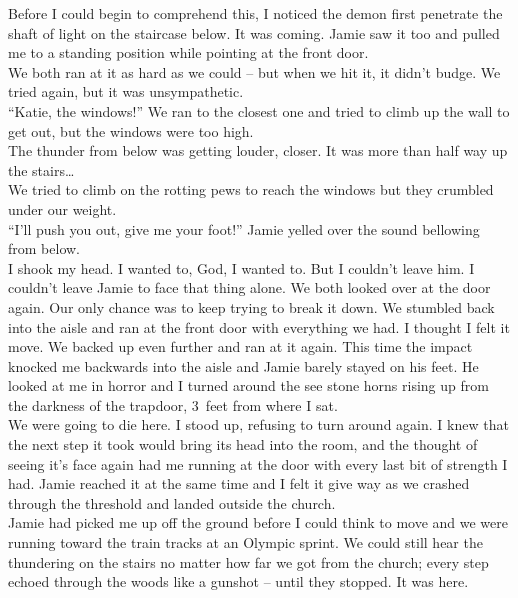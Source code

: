 \documentclass[a5paper]{scrartcl}
\begin{document}
Before I could begin to comprehend this, I noticed the demon first penetrate the shaft of light on the staircase below. It was coming. Jamie saw it too and pulled me to a standing position while pointing at the front door.\\


We both ran at it as hard as we could – but when we hit it, it didn't budge. We tried again, but it was unsympathetic.\\


\enquote{Katie, the windows!} We ran to the closest one and tried to climb up the wall to get out, but the windows were too high.\\


The thunder from below was getting louder, closer. It was more than half way up the stairs\dots\\


We tried to climb on the rotting pews to reach the windows but they crumbled under our weight.\\


\enquote{I'll push you out, give me your foot!} Jamie yelled over the sound bellowing from below.\\


I shook my head. I wanted to, God, I wanted to. But I couldn't leave him. I couldn't leave Jamie to face that thing alone. We both looked over at the door again. Our only chance was to keep trying to break it down. We stumbled back into the aisle and ran at the front door with everything we had. I thought I felt it move. We backed up even further and ran at it again. This time the impact knocked me backwards into the aisle and Jamie barely stayed on his feet. He looked at me in horror and I turned around the see stone horns rising up from the darkness of the trapdoor, 3~feet from where I sat. \\


We were going to die here. I stood up, refusing to turn around again. I knew that the next step it took would bring its head into the room, and the thought of seeing it's face again had me running at the door with every last bit of strength I had. Jamie reached it at the same time and I felt it give way as we crashed through the threshold and landed outside the church.\\


Jamie had picked me up off the ground before I could think to move and we were running toward the train tracks at an Olympic sprint. We could still hear the thundering on the stairs no matter how far we got from the church; every step echoed through the woods like a gunshot – until they stopped. It was here.\\
\end{document}
